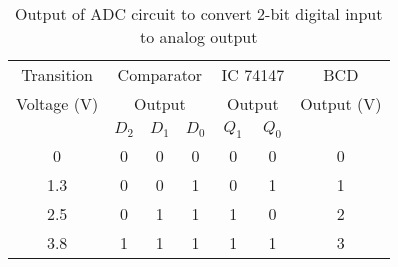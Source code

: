\begin{table}[H]
    \centering
    \begin{tabular}{|c|ccc|cc|c|}
        \hline
        Transition & \multicolumn{3}{c|}{Comparator} & \multicolumn{2}{c|}{IC 74147} & BCD \\
        Voltage (V) & \multicolumn{3}{c|}{Output} & \multicolumn{2}{c|}{Output} & Output (V) \\ \cline{2-6}
         & \multicolumn{1}{c|}{$D_2$} & \multicolumn{1}{c|}{$D_1$} & $D_0$ & \multicolumn{1}{c|}{$Q_1$} & $Q_0$ &  \\ \hline
        0 & \multicolumn{1}{c|}{0} & \multicolumn{1}{c|}{0} & 0 & \multicolumn{1}{c|}{0} & 0 & 0 \\ \hline
        1.3 & \multicolumn{1}{c|}{0} & \multicolumn{1}{c|}{0} & 1 & \multicolumn{1}{c|}{0} & 1 & 1 \\ \hline
        2.5 & \multicolumn{1}{c|}{0} & \multicolumn{1}{c|}{1} & 1 & \multicolumn{1}{c|}{1} & 0 & 2 \\ \hline
        3.8 & \multicolumn{1}{c|}{1} & \multicolumn{1}{c|}{1} & 1 & \multicolumn{1}{c|}{1} & 1 & 3 \\ \hline
        \end{tabular}
    \caption{ Output of ADC circuit to convert 2-bit digital input to analog output}
    \label{tab:3}
\end{table}